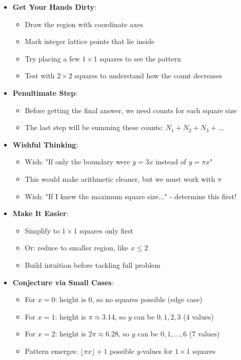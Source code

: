 \documentclass[12pt]{article}
\begin{document}
\begin{strategicbox}
\begin{itemize}[leftmargin=*]
    \item \textbf{Get Your Hands Dirty}: 
    \begin{itemize}
        \item Draw the region with coordinate axes
        \item Mark integer lattice points that lie inside
        \item Try placing a few $1 \times 1$ squares to see the pattern
        \item Test with $2 \times 2$ squares to understand how the count decreases
    \end{itemize}
    
    \item \textbf{Penultimate Step}: 
    \begin{itemize}
        \item Before getting the final answer, we need counts for each square size
        \item The last step will be summing these counts: $N_1 + N_2 + N_3 + \ldots$
    \end{itemize}
    
    \item \textbf{Wishful Thinking}: 
    \begin{itemize}
        \item Wish: "If only the boundary were $y = 3x$ instead of $y = \pi x$"
        \item This would make arithmetic cleaner, but we must work with $\pi$
        \item Wish: "If I knew the maximum square size..." - determine this first!
    \end{itemize}
    
    \item \textbf{Make It Easier}: 
    \begin{itemize}
        \item Simplify to $1 \times 1$ squares only first
        \item Or: reduce to smaller region, like $x \leq 2$
        \item Build intuition before tackling full problem
    \end{itemize}
    
    \item \textbf{Conjecture via Small Cases}: 
    \begin{itemize}
        \item For $x=0$: height is 0, so no squares possible (edge case)
        \item For $x=1$: height is $\pi \approx 3.14$, so $y$ can be $0, 1, 2, 3$ (4 values)
        \item For $x=2$: height is $2\pi \approx 6.28$, so $y$ can be $0, 1, \ldots, 6$ (7 values)
        \item Pattern emerges: $\lfloor \pi x \rfloor + 1$ possible $y$-values for $1 \times 1$ squares
    \end{itemize}
    

\end{itemize}
\end{strategicbox}
\end{document}
